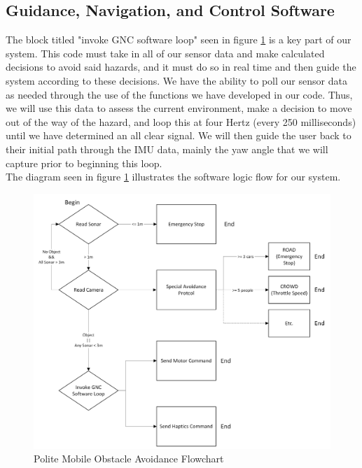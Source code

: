 \subsection{Guidance, Navigation, and Control Software} \label{GNC_Software}
\noindent The block titled "invoke GNC software loop" seen in figure \ref{fig:Polite-Mobile-Obstacle-Avoidance-Flowchart} is a key part of our system. This code must take in all of our sensor data and make calculated decisions to avoid said hazards, and it must do so in real time and then guide the system according to these decisions. We have the ability to poll our sensor data as needed through the use of the functions we have developed in our code. Thus, we will use this data to assess the current environment, make a decision to move out of the way of the hazard, and loop this at four Hertz (every 250 milliseconds) until we have determined an all clear signal. We will then guide the user back to their initial path through the IMU data, mainly the yaw angle that we will capture prior to beginning this loop. \\
\noindent The diagram seen in figure \ref{fig:Polite-Mobile-Obstacle-Avoidance-Flowchart} illustrates the software logic flow for our system. \\

\begin{figure}[H]
	\centering
	\includegraphics[width=1.0\textwidth]{./Images/Polite-Mobile-Obstacle-Avoidance-Flowchart.png}
	\caption{\label{fig:Polite-Mobile-Obstacle-Avoidance-Flowchart}Polite Mobile Obstacle Avoidance Flowchart}
\end{figure}

